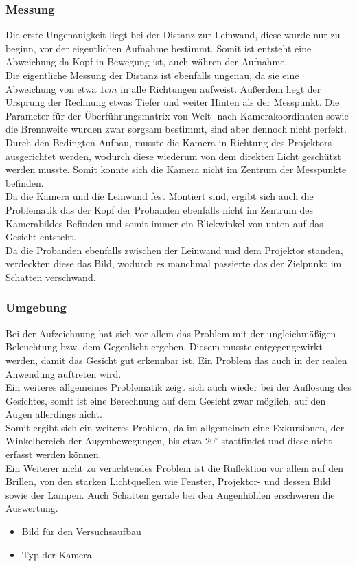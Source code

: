\subsubsection{Messung}
Die erste Ungenauigkeit liegt bei der Distanz zur Leinwand, diese wurde nur zu beginn, vor der eigentlichen Aufnahme bestimmt. Somit ist entsteht eine Abweichung da Kopf in Bewegung ist, auch währen der Aufnahme.\\
Die eigentliche Messung der Distanz ist ebenfalls ungenau, da sie eine Abweichung von etwa $1cm$ in alle Richtungen aufweist. Außerdem liegt der Ursprung der Rechnung etwas Tiefer und weiter Hinten als der Messpunkt.
Die Parameter für der Überführungsmatrix von Welt- nach Kamerakoordinaten sowie die Brennweite wurden zwar sorgsam bestimmt, sind aber dennoch nicht perfekt.\\
Durch den Bedingten Aufbau, musste die Kamera in Richtung des Projektors ausgerichtet werden, wodurch diese wiederum von dem direkten Licht geschützt werden musste. Somit konnte sich die Kamera nicht im Zentrum der Messpunkte befinden.\\
Da die Kamera und die Leinwand fest Montiert sind, ergibt sich auch die Problematik das der Kopf der Probanden ebenfalls nicht im Zentrum des Kamerabildes Befinden und somit immer ein Blickwinkel von unten auf das Gesicht entsteht.\\
Da die Probanden ebenfalls zwischen der Leinwand und dem Projektor standen, verdeckten diese das Bild, wodurch es manchmal passierte das der Zielpunkt im Schatten verschwand.
\subsubsection{Umgebung}
Bei der Aufzeichnung hat sich vor allem das Problem mit der ungleichmäßigen Beleuchtung bzw. dem Gegenlicht ergeben. Diesem musste entgegengewirkt werden, damit das Gesicht gut erkennbar ist. Ein Problem das auch in der realen Anwendung auftreten wird.\\
Ein weiteres allgemeines Problematik zeigt sich auch wieder bei der Auflösung des Gesichtes, somit ist eine Berechnung auf dem Gesicht zwar möglich, auf den Augen allerdings nicht.\\
Somit ergibt sich ein weiteres Problem, da im allgemeinen eine Exkursionen, der Winkelbereich der Augenbewegungen, bis etwa  $20^\circ$ stattfindet und diese nicht erfasst werden können.\\
Ein Weiterer nicht zu verachtendes Problem ist die Ruflektion vor allem auf den Brillen, von den starken Lichtquellen wie Fenster, Projektor- und dessen Bild sowie der Lampen. Auch Schatten gerade bei den Augenhöhlen erschweren die Auswertung. 
\begin{itemize}
	\item Bild für den Versuchsaufbau
	\item Typ der Kamera
\end{itemize}
